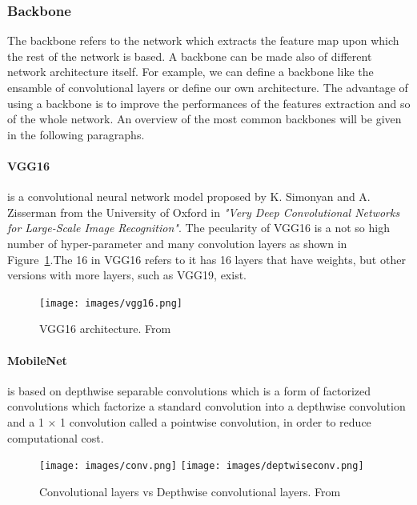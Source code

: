 \documentclass[12pt,a4paper]{report}
\begin{document}
\subsubsection{Backbone}

The backbone refers to the network which extracts the feature map upon which the rest of the network is based\cite{cnnbackbones}. A backbone can be made also of different network architecture itself. For example, we can define a backbone like the ensamble of convolutional layers or define our own architecture. The advantage of using a backbone is to improve the performances of the features extraction and so of the whole network\cite{cnnbackbones}. An overview of the most common backbones will be given in the following paragraphs.

\paragraph{VGG16} is a convolutional neural network model proposed by K. Simonyan and A. Zisserman from the University of Oxford in \textit{"Very Deep Convolutional Networks for Large-Scale Image Recognition"}\cite{vgg16}.
The pecularity of VGG16 is a not so high number of hyper-parameter and many convolution layers as shown in Figure~\ref{vgg16}.The 16 in VGG16 refers to it has 16 layers that have weights, but other versions with more layers, such as VGG19, exist.

\begin{figure}[h!]
	\centering
	\texttt{[image: images/vgg16.png]}
	\caption{VGG16 architecture. From \cite{url:vgg16} }\label{vgg16}
\end{figure}

\paragraph{MobileNet} is based on depthwise separable convolutions which is a form of factorized convolutions which factorize a standard convolution into a depthwise convolution and a 1 × 1 convolution called a pointwise convolution, in  order to reduce computational cost\cite{mobilenet}.

\begin{figure}[h!]

    \centering
    \texttt{[image: images/conv.png]}
    \texttt{[image: images/deptwiseconv.png]}
    
    \caption{Convolutional layers vs Depthwise convolutional layers. From \cite{mobilenet}}
    \label{mobilenet}
    
    \end{figure}
\end{document}
